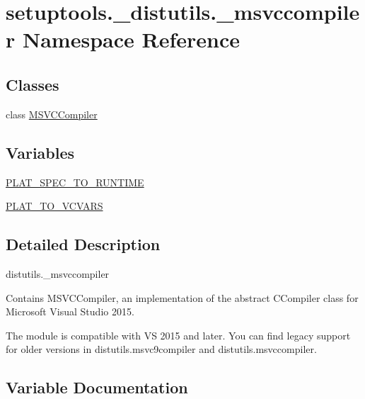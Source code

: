 \hypertarget{namespacesetuptools_1_1__distutils_1_1__msvccompiler}{}\section{setuptools.\+\_\+distutils.\+\_\+msvccompiler Namespace Reference}
\label{namespacesetuptools_1_1__distutils_1_1__msvccompiler}
\subsection*{Classes}
\begin{DoxyCompactItemize}
\item 
class \hyperlink{classsetuptools_1_1__distutils_1_1__msvccompiler_1_1MSVCCompiler}{M\+S\+V\+C\+Compiler}
\end{DoxyCompactItemize}
\subsection*{Variables}
\begin{DoxyCompactItemize}
\item 
\hyperlink{namespacesetuptools_1_1__distutils_1_1__msvccompiler_ab3bc23edb49fc584601f3a40bb14d681}{P\+L\+A\+T\+\_\+\+S\+P\+E\+C\+\_\+\+T\+O\+\_\+\+R\+U\+N\+T\+I\+ME}
\item 
\hyperlink{namespacesetuptools_1_1__distutils_1_1__msvccompiler_a9379b7c58286950842bf24b6e58fd78a}{P\+L\+A\+T\+\_\+\+T\+O\+\_\+\+V\+C\+V\+A\+RS}
\end{DoxyCompactItemize}


\subsection{Detailed Description}
\begin{DoxyVerb}distutils._msvccompiler

Contains MSVCCompiler, an implementation of the abstract CCompiler class
for Microsoft Visual Studio 2015.

The module is compatible with VS 2015 and later. You can find legacy support
for older versions in distutils.msvc9compiler and distutils.msvccompiler.
\end{DoxyVerb}
 

\subsection{Variable Documentation}
\mbox{\label{namespacesetuptools_1_1__distutils_1_1__msvccompiler_ab3bc23edb49fc584601f3a40bb14d681}} 
